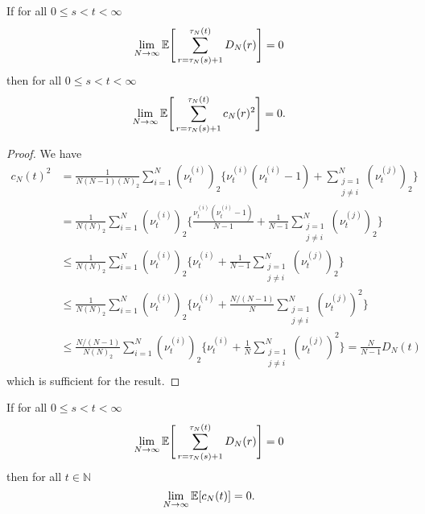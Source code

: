 \begin{lemma} \label{lem:removeass3}
If for all $0 \leq s < t < \infty$
\begin{equation*}
\lim_{ N \rightarrow \infty } \mathbb{E}\Bigg[ \sum_{ r = \tau_N( s ) + 1 }^{ \tau_N( t ) } D_N( r ) \Bigg] = 0
\end{equation*}
then for all $0 \leq s < t < \infty$
\begin{equation*}
\lim_{ N \rightarrow \infty } \mathbb{E}\Bigg[ \sum_{ r = \tau_N( s ) + 1 }^{ \tau_N( t ) } c_N( r )^2 \Bigg] = 0 .
\end{equation*}
\end{lemma}

\begin{proof}
We have
\begin{align*}
c_N( t )^2 &= \frac{ 1 }{ N ( N - 1 ) ( N )_2 } \sum_{ i = 1 }^N ( \nu_t^{(i)})_2 \Bigg\{ \nu_t^{(i)} ( \nu_t^{(i)} - 1 ) + \sum_{\substack{j=1\\ j \neq i }}^N ( \nu_t^{(j)} )_2 \Bigg\} \\
&= \frac{ 1 }{ N ( N )_2 } \sum_{ i = 1 }^N ( \nu_t^{(i)} )_2 \Bigg\{ \frac{ \nu_t^{(i)} ( \nu_t^{(i)} - 1 ) }{ N - 1 } + \frac{ 1 }{ N - 1 } \sum_{\substack{j=1\\ j \neq i }}^N ( \nu_t^{(j)} )_2 \Bigg\} \\
&\leq \frac{ 1 }{ N ( N )_2 } \sum_{ i = 1 }^N ( \nu_t^{(i)})_2 \Bigg\{ \nu_t^{(i)} + \frac{ 1 }{ N - 1 } \sum_{\substack{j=1\\ j \neq i }}^N ( \nu_t^{(j)} )_2 \Bigg\} \\
&\leq \frac{ 1 }{ N ( N )_2 } \sum_{ i = 1 }^N ( \nu_t^{(i)})_2 \Bigg\{ \nu_t^{(i)} + \frac{ N / ( N - 1 ) }{ N } \sum_{\substack{j=1\\ j \neq i }}^N ( \nu_t^{(j)} )^2 \Bigg\} \\
&\leq \frac{ N / ( N - 1 ) }{ N ( N )_2 } \sum_{ i = 1 }^N ( \nu_t^{(i)})_2 \Bigg\{ \nu_t^{(i)} + \frac{ 1 }{ N } \sum_{\substack{j=1\\ j \neq i }}^N ( \nu_t^{(j)} )^2 \Bigg\} = \frac{ N }{ N - 1 } D_N( t )
\end{align*}
which is sufficient for the result.
\end{proof}


\begin{lemma} \label{thm:DNimpliescN}
If for all $0 \leq s < t < \infty$
\begin{equation*}
\lim_{ N \rightarrow \infty } \mathbb{E}\Bigg[ \sum_{ r = \tau_N( s ) + 1 }^{ \tau_N( t ) } D_N( r ) \Bigg] = 0
\end{equation*}
then for all $ t \in \mathbb{N} $
\begin{equation*}
\lim_{ N \rightarrow \infty } \mathbb{E}[ c_N( t ) ] = 0 .
\end{equation*}
\end{lemma}

